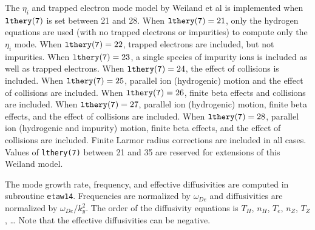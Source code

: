 
The $\eta_i$ and trapped electron mode model 
by Weiland et al\cite{nord90a} is implemented when
${\tt lthery(7)}$ is set between 21 and 28.
When $ {\tt lthery(7)} = 21 $, only the hydrogen equations are used
(with no trapped electrons or impurities) to compute only the 
$ \eta_i $ mode.
When $ {\tt lthery(7)} = 22 $, trapped electrons are included,
but not impurities.
When $ {\tt lthery(7)} = 23 $, a single species of impurity ions is
included as well as trapped electrons.
When $ {\tt lthery(7)} = 24 $, the effect of collisions is included.
When $ {\tt lthery(7)} = 25 $, parallel ion (hydrogenic) motion and 
the effect of collisions are included.
When $ {\tt lthery(7)} = 26 $, finite beta effects and collisions are
included.
When $ {\tt lthery(7)} = 27 $, parallel ion (hydrogenic) motion, 
finite beta effects, and the effect of collisions are included.
When $ {\tt lthery(7)} = 28 $, parallel ion (hydrogenic and impurity) motion, 
finite beta effects, and the effect of collisions are included.
Finite Larmor radius corrections are included in all cases.
Values of {\tt lthery(7)} between 21 and 35 are reserved for extensions
of this Weiland model.

The mode growth rate, frequency, and effective diffusivities are
computed in subroutine {\tt etaw14}.
Frequencies are normalized by $\omega_{De}$ and diffusivities are
normalized by $ \omega_{De} / k_y^2 $.
The order of the diffusivity equations is 
$ T_H $, $ n_H $, $ T_e $, $ n_Z $, $ T_Z $, \ldots
Note that the effective diffusivities can be negative.

